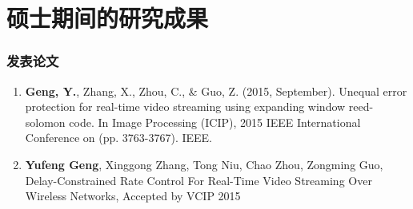 %
%
%
%


%
%
\chapter*{硕士期间的研究成果}
{}
\renewcommand\labelenumi{[\theenumi]}

\subsection*{发表论文}
\newitemsep
{\typebib
\begin{enumerate}
  \item \textbf{Geng, Y.}, Zhang, X., Zhou, C., \& Guo, Z. (2015, September). Unequal error protection for real-time video streaming using expanding window reed-solomon code. In Image Processing (ICIP), 2015 IEEE International Conference on (pp. 3763-3767). IEEE.
  \item \textbf{Yufeng Geng}, Xinggong Zhang, Tong Niu, Chao Zhou, Zongming Guo, Delay-Constrained Rate Control For Real-Time Video Streaming Over Wireless Networks, Accepted by VCIP 2015
\end{enumerate}
}


